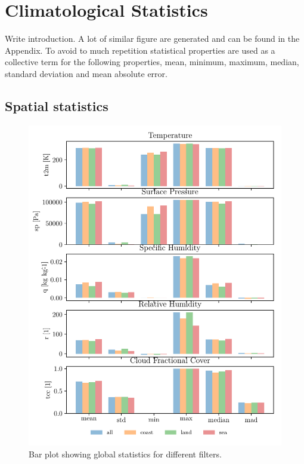 \section{Climatological Statistics}
Write introduction. A lot of similar figure are generated and can be found in the Appendix. To avoid to much repetition statistical properties are used as a collective term for the following properties, mean, minimum, maximum, median, standard deviation and mean absolute error.

\subsection{Spatial statistics}

\begin{figure}[ht]
    \centering
    \includegraphics{python_figs/bar_plot_global_statistics_new_legend.pdf}
    \caption{Bar plot showing global statistics for different filters.}
    \label{fig:bar_plot_global_stats}
\end{figure}
